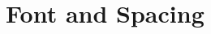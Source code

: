 \documentclass[a5paper, 10pt]{article}
\begin{document}



%




\section{Font and Spacing}
\label{sec:app-font-spacing}
\end{document}
